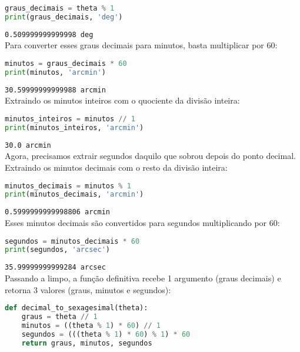 \begin{lstlisting}[language=Python]
graus_decimais = theta % 1
print(graus_decimais, 'deg')
\end{lstlisting}
\noindent\texttt{0.509999999999998 deg}\\

\noindent Para converter esses graus decimais para minutos, basta multiplicar por 60:

\begin{lstlisting}[language=Python]
minutos = graus_decimais * 60
print(minutos, 'arcmin')
\end{lstlisting}
\noindent\texttt{30.59999999999988 arcmin}\\

\noindent Extraindo os minutos inteiros com o quociente da divisão inteira:

\begin{lstlisting}[language=Python]
minutos_inteiros = minutos // 1
print(minutos_inteiros, 'arcmin')
\end{lstlisting}
\noindent\texttt{30.0 arcmin}\\

\noindent Agora, precisamos extrair segundos daquilo que sobrou depois do ponto decimal. Extraindo os minutos decimais com o resto da divisão inteira:

\begin{lstlisting}[language=Python]
minutos_decimais = minutos % 1
print(minutos_decimais, 'arcmin')
\end{lstlisting}
\noindent\texttt{0.5999999999998806 arcmin}\\

\noindent Esses minutos decimais são convertidos para segundos multiplicando por 60:

\begin{lstlisting}[language=Python]
segundos = minutos_decimais * 60
print(segundos, 'arcsec')
\end{lstlisting}
\noindent\texttt{35.99999999999284 arcsec}\\

Passando a limpo, a função definitiva recebe 1 argumento (graus decimais) e retorna 3 valores (graus, minutos e segundos):

\begin{lstlisting}[language=Python]
def decimal_to_sexagesimal(theta):
    graus = theta // 1
    minutos = ((theta % 1) * 60) // 1
    segundos = (((theta % 1) * 60) % 1) * 60
    return graus, minutos, segundos
\end{lstlisting}

